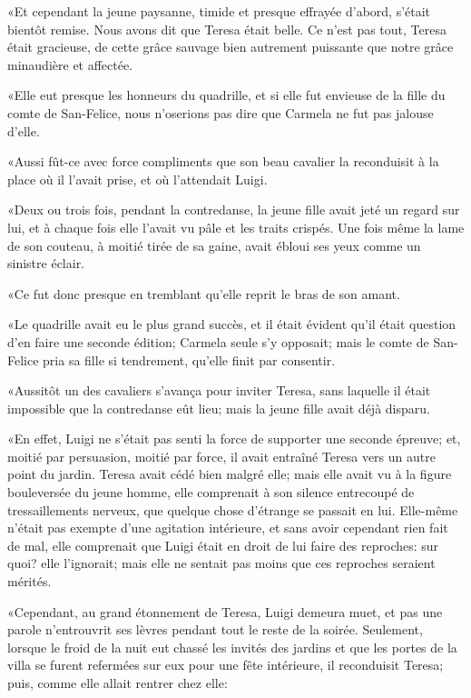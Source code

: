 «Et cependant la jeune paysanne, timide et presque effrayée d'abord, s'était bientôt remise. Nous avons dit que Teresa était belle. Ce n'est pas tout, Teresa était gracieuse, de cette grâce sauvage bien autrement puissante que notre grâce minaudière et affectée. 

«Elle eut presque les honneurs du quadrille, et si elle fut envieuse de la fille du comte de San-Felice, nous n'oserions pas dire que Carmela ne fut pas jalouse d'elle. 

«Aussi fût-ce avec force compliments que son beau cavalier la reconduisit à la place où il l'avait prise, et où l'attendait Luigi.  

«Deux ou trois fois, pendant la contredanse, la jeune fille avait jeté un regard sur lui, et à chaque fois elle l'avait vu pâle et les traits crispés. Une fois même la lame de son couteau, à moitié tirée de sa gaine, avait ébloui ses yeux comme un sinistre éclair. 

«Ce fut donc presque en tremblant qu'elle reprit le bras de son amant. 

«Le quadrille avait eu le plus grand succès, et il était évident qu'il était question d'en faire une seconde édition; Carmela seule s'y opposait; mais le comte de San-Felice pria sa fille si tendrement, qu'elle finit par consentir. 

«Aussitôt un des cavaliers s'avança pour inviter Teresa, sans laquelle il était impossible que la contredanse eût lieu; mais la jeune fille avait déjà disparu. 

«En effet, Luigi ne s'était pas senti la force de supporter une seconde épreuve; et, moitié par persuasion, moitié par force, il avait entraîné Teresa vers un autre point du jardin. Teresa avait cédé bien malgré elle; mais elle avait vu à la figure bouleversée du jeune homme, elle comprenait à son silence entrecoupé de tressaillements nerveux, que quelque chose d'étrange se passait en lui. Elle-même n'était pas exempte d'une agitation intérieure, et sans avoir cependant rien fait de mal, elle comprenait que Luigi était en droit de lui faire des reproches: sur quoi? elle l'ignorait; mais elle ne sentait pas moins que ces reproches seraient mérités.  

«Cependant, au grand étonnement de Teresa, Luigi demeura muet, et pas une parole n'entrouvrit ses lèvres pendant tout le reste de la soirée. Seulement, lorsque le froid de la nuit eut chassé les invités des jardins et que les portes de la villa se furent refermées sur eux pour une fête intérieure, il reconduisit Teresa; puis, comme elle allait rentrer chez elle: 


